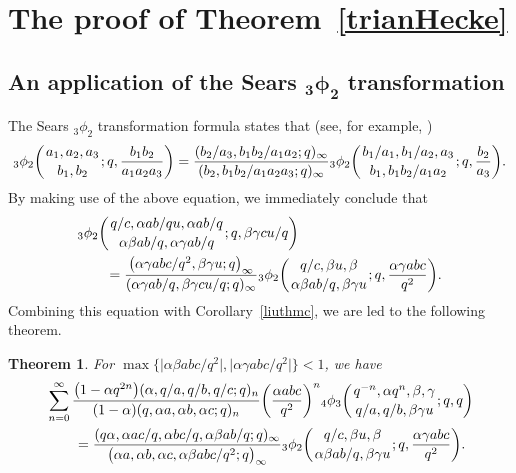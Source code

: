 \documentclass[10pt,a4paper]{amsart}
\numberwithin{equation}{section}
\newtheorem{Theorem}{Theorem}[section]
\begin{document}
\section{The proof of Theorem~\ref{trianHecke}}\label{sec5}
\subsection[An application of the Sears \_3phi\_2 transformation]{An application of the Sears $\boldsymbol{_3\phi_2}$ transformation}
The Sears $_3\phi_2$ transformation formula states that (see, for example, \cite[Theorem~3]{Liu2003})
\begin{align*}%
	{_3\phi_2}\biggl({{a_1, a_2, a_3}\atop{b_1, b_2}}; q, \frac{b_1b_2}{a_1a_2a_3}\biggr)
	=\frac{(b_2/a_3, b_1b_2/{a_1 a_2}; q)_\infty}
	{(b_2, b_1b_2/{a_1a_2a_3}; q)_\infty}
	{_3\phi_2}\biggl({{b_1/a_1, b_1/a_2, a_3}\atop{b_1, b_1b_2/{a_1a_2}}}; q, \frac{b_2}{a_3}\biggr).	
\end{align*}	
By making use of the above equation, we immediately conclude that
\begin{align*}
	&{_3\phi_2} \biggl({{q/c, \alpha ab/qu, \alpha ab/q}\atop{\alpha \beta ab/q, \alpha \gamma ab/q}}; q, \beta \gamma cu/q \biggr)\\
	&\qquad{}=\frac{\bigl(\alpha \gamma abc/q^2, \beta \gamma u; q\bigr)_\infty}
	{(\alpha \gamma ab/q, \beta \gamma cu/q; q)_\infty}
	{_3\phi_2} \biggl({{q/c, \beta u, \beta}\atop{\alpha \beta ab/q, \beta \gamma u}}; q, \frac{\alpha \gamma abc}{q^2}\biggr).
\end{align*}
Combining this equation with Corollary~\ref{liuthmc}, we are led to the following theorem.
\begin{Theorem}\label{liuthmd}
	For $\max\bigl\{\bigl|\alpha \beta abc/q^2\bigr|, \bigl|\alpha \gamma abc/q^2\bigr| \bigr\}<1$, we have
	\begin{align*}
		&\sum_{n=0}^\infty \frac{\bigl(1-\alpha q^{2n}\bigr)(\alpha, q/a, q/b, q/c; q)_n}{(1-\alpha)(q, \alpha a, \alpha b, \alpha c; q)_n}\biggl(\frac{\alpha abc}{q^2}\biggr)^n {_4\phi_3}\biggl({{q^{-n}, \alpha q^n, \beta, \gamma}
			\atop{q/a, q/b, \beta \gamma u}}; q, q\biggr)\\
		&\qquad{}=\frac{(q\alpha, \alpha ac/q, \alpha bc/q, \alpha \beta ab/q; q )_\infty}{\bigl(\alpha a, \alpha b, \alpha c, \alpha \beta abc/q^2; q \bigr)_\infty} {_3\phi_2} \biggl({{q/c, \beta u, \beta}\atop{\alpha \beta ab/q, \beta \gamma u}}; q, \frac{\alpha \gamma abc}{q^2}\biggr).
	\end{align*}
\end{Theorem}
\end{document}
